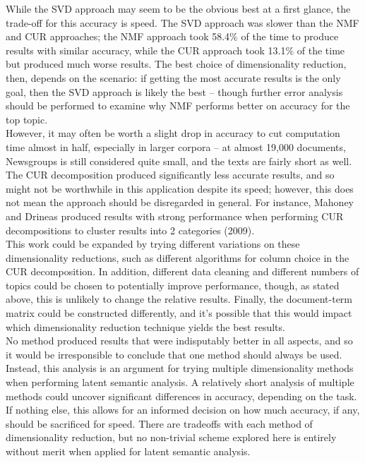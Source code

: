 \documentclass{article}
\begin{document}
While the SVD approach may seem to be the obvious best at a first glance, the trade-off for this accuracy is speed. The SVD approach was slower than the NMF and CUR approaches; the NMF approach took 58.4\% of the time to produce results with similar accuracy, while the CUR approach took 13.1\% of the time but produced much worse results. The best choice of dimensionality reduction, then, depends on the scenario: if getting the most accurate results is the only goal, then the SVD approach is likely the best -- though further error analysis should be performed to examine why NMF performs better on accuracy for the top topic. \\

However, it may often be worth a slight drop in accuracy to cut computation time almost in half, especially in larger corpora -- at almost 19,000 documents, Newsgroups is still considered quite small, and the texts are fairly short as well. The CUR decomposition produced significantly less accurate results, and so might not be worthwhile in this application despite its speed; however, this does not mean the approach should be disregarded in general. For instance, Mahoney and Drineas produced results with strong performance when performing CUR decompositions to cluster results into 2 categories (2009). \\

This work could be expanded by trying different variations on these dimensionality reductions, such as different algorithms for column choice in the CUR decomposition. In addition, different data cleaning and different numbers of topics could be chosen to potentially improve performance, though, as stated above, this is unlikely to change the relative results. Finally, the document-term matrix could be constructed differently, and it's possible that this would impact which dimensionality reduction technique yields the best results.\\

No method produced results that were indisputably better in all aspects, and so it would be irresponsible to conclude that one method should always be used. Instead, this analysis is an argument for trying multiple dimensionality methods when performing latent semantic analysis. A relatively short analysis of multiple methods could uncover significant differences in accuracy, depending on the task. If nothing else, this allows for an informed decision on how much accuracy, if any, should be sacrificed for speed. There are tradeoffs with each method of dimensionality reduction, but no non-trivial scheme explored here is entirely without merit when applied for latent semantic analysis. \\
\end{document}
